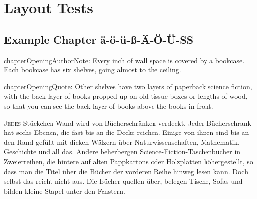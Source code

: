 
\RequirePackage[pdf]{layout/hp-book}











{
\pagestyle{empty}

\def\volumenumber{}
\def\volumetitle{}

% 

% 
\cleartorecto
}
\setcounter{page}{1}

\part{Layout Tests}


\chapter{Example Chapter ä-ö-ü-ß-Ä-Ö-Ü-SS}

\begin{chapterOpeningAuthorNote}
chapterOpeningAuthorNote: Every inch of wall space is covered by a bookcase. Each bookcase has six shelves, going almost to the ceiling.
\end{chapterOpeningAuthorNote}
\begin{chapterOpeningQuote}
chapterOpeningQuote: Other shelves have two layers of paperback science fiction, with the back layer of books propped up on old tissue boxes or lengths of wood, so that you can see the back layer of books above the books in front.
\end{chapterOpeningQuote}

\lettrine{J}{edes} Stückchen Wand wird von Bücherschränken verdeckt. Jeder Bücherschrank hat sechs Ebenen, die fast bis an die Decke reichen. Einige von ihnen sind bis an den Rand gefüllt mit dicken Wälzern über Naturwissenschaften, Mathematik, Geschichte und all das. Andere beherbergen Science-Fiction-Taschenbücher in Zweierreihen, die hintere auf alten Pappkartons oder Holzplatten höhergestellt, so dass man die Titel über die Bücher der vorderen Reihe hinweg lesen kann. Doch selbst das reicht nicht aus. Die Bücher quellen über, belegen Tische, Sofas und bilden kleine Stapel unter den Fenstern.

